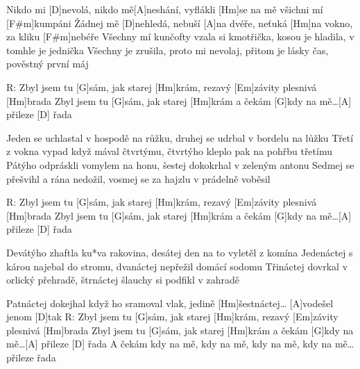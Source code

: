 
Nikdo mi [D]nevolá, nikdo mě[A]neshání, vyflákli [Hm]se na mě všichni mí [F#m]kumpáni 
Žádnej mě [D]nehledá, nebuší [A]na dvéře, neťuká [Hm]na vokno, za kliku [F#m]nebéře
Všechny mí kunčofty vzala si kmotřička, kosou je hladila, v tomhle je jednička 
Všechny je zrušila, proto mi nevolaj, přitom je lásky čas, pověstný první máj

R: Zbyl jsem tu [G]sám, jak starej [Hm]krám, rezavý [Em]závity plesnivá [Hm]brada 
Zbyl jsem tu [G]sám, jak starej [Hm]krám a čekám [G]kdy na mě…[A] přileze [D] řada 

Jeden se uchlastal v hospodě na růžku, druhej se udrbal v bordelu na lůžku 
Třetí z vokna vypad když mával čtvrtýmu, čtvrtýho kleplo pak na pohřbu třetímu 
Pátýho odpráskli vomylem na honu, šestej dokokrhal v zeleným antonu 
Sedmej se přešvihl a rána nedožil, vosmej se za hajzlu v prádelně voběsil 

R: Zbyl jsem tu [G]sám, jak starej [Hm]krám, rezavý [Em]závity plesnivá [Hm]brada 
Zbyl jsem tu [G]sám, jak starej [Hm]krám a čekám [G]kdy na mě…[A] přileze [D] řada
 
Devátýho zhaftla ku*va rakovina, desátej den na to vyletěl z komína 
Jedenáctej s károu najebal do stromu, dvanáctej nepřežil domácí sodomu 
Třináctej dovrkal v orlický přehradě, štrnáctej šlauchy si podfikl v zahradě 

Patnáctej dokejhal když ho sramoval vlak, jedině [Hm]\null šestnáctej… [A]vodešel jenom [D]tak 
R: Zbyl jsem tu [G]sám, jak starej [Hm]krám, rezavý [Em]závity plesnivá [Hm]brada 
Zbyl jsem tu [G]sám, jak starej [Hm]krám a čekám [G]kdy na mě…[A] přileze [D] řada 
A čekám kdy na mě, kdy na mě, kdy na mě, kdy na mě… přileze řada 